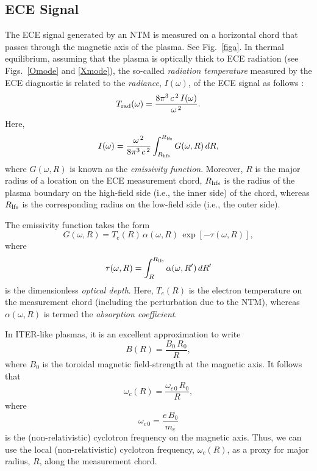 \documentclass{iopjournal}
\begin{document}
\subsection{ECE Signal}
The ECE signal generated by an NTM is  measured on a horizontal chord that passes through the magnetic axis of the plasma. See Fig.~\ref{figa}. 
In thermal equilibrium, assuming that the plasma is optically thick to ECE radiation (see Figs.~\ref{Omode} and \ref{Xmode}), the so-called {\em radiation temperature}\/ measured by the ECE diagnostic is related to the {\em radiance}, $I(\omega)$, of the ECE signal as follows \cite{bornatici}:
\begin{equation}\label{a8}
T_{\rm rad}(\omega)=\frac{8\pi^3\,c^{\,2}\, I(\omega)}{\omega^{\,2}}.
\end{equation}
Here,
\begin{equation}\label{a9}
I(\omega) = \frac{\omega^{\,2}}{8\pi^3\,c^{\,2}}\int_{R_{\rm hfs}}^{R_{\rm lfs}}G(\omega, R)\,dR,
\end{equation}
where $G(\omega,R)$ is known as the {\em emissivity function}. Moreover, $R$ is the major radius of a location on the ECE measurement chord, $R_{\rm hfs}$ is the radius
of the plasma boundary on the high-field side (i.e., the inner side) of the chord, whereas $R_{\rm lfs}$ is the corresponding radius 
on the low-field side (i.e., the outer side).

The emissivity function takes the form \cite{bornatici}
\begin{equation}\label{a10}
G(\omega, R) = T_e(R)\,\alpha(\omega,R)\,\exp\left[-\tau(\omega,R)\right],
\end{equation}
where 
\begin{equation}\label{a11}
\tau(\omega,R) = \int_R^{R_{\rm lfs}}\alpha(\omega,R')\,dR'
\end{equation}
is the dimensionless {\em optical depth}. 
Here, $T_e(R)$ is the electron temperature on the measurement chord (including the perturbation due to the NTM), whereas $\alpha(\omega,R)$
is termed the {\em absorption coefficient}.

In ITER-like plasmas, it is an excellent approximation to write
\begin{equation}
B(R) = \frac{B_0\,R_0}{R},
\end{equation}
where $B_0$ is the toroidal magnetic field-strength at the magnetic axis.  It follows that
\begin{equation}\label{a13}
\omega_c(R) = \frac{\omega_{c\,0}\,R_0}{R},
\end{equation}
where
\begin{equation}
\omega_{c\,0} = \frac{e\,B_0}{m_e}
\end{equation}
is the (non-relativistic) cyclotron frequency on the magnetic axis. Thus, we can use the local (non-relativistic) cyclotron frequency, $\omega_c(R)$, as a proxy for major radius, $R$,  along the measurement chord. 
\end{document}

